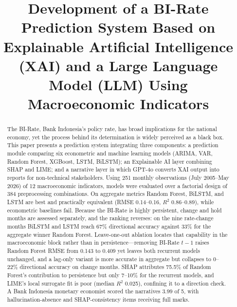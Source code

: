 \documentclass[conference]{IEEEtran}
\begin{document}
\title{Development of a BI-Rate Prediction System Based on Explainable Artificial Intelligence (XAI) and a Large Language Model (LLM) Using Macroeconomic Indicators}

\author{
\and
{}
}

\maketitle

\begin{abstract}
The BI-Rate, Bank Indonesia's policy rate, has broad implications for the national economy, yet the process behind its determination is widely perceived as a black box. This paper presents a prediction system integrating three components: a prediction module comparing six econometric and machine learning models (ARIMA, VAR, Random Forest, XGBoost, LSTM, BiLSTM); an Explainable AI layer combining SHAP and LIME; and a narrative layer in which GPT-4o converts XAI output into reports for non-technical stakeholders. Using 251 monthly observations (July 2005--May 2026) of 12 macroeconomic indicators, models were evaluated over a factorial design of 384 preprocessing combinations. On aggregate metrics Random Forest, BiLSTM, and LSTM are best and practically equivalent (RMSE 0.14--0.16, $R^2$ 0.86--0.89), while econometric baselines fail. Because the BI-Rate is highly persistent, change and hold months are assessed separately, and the ranking reverses: on the nine rate-change months BiLSTM and LSTM reach 67\% directional accuracy against 33\% for the aggregate winner Random Forest. Leave-one-out ablation locates that capability in the macroeconomic block rather than in persistence---removing BI-Rate $t-1$ raises Random Forest RMSE from 0.143 to 0.409 yet leaves both recurrent models unchanged, and a lag-only variant is more accurate in aggregate but collapses to 0--22\% directional accuracy on change months. SHAP attributes 75.5\% of Random Forest's contribution to persistence but only 7--10\% for the recurrent models, and LIME's local surrogate fit is poor (median $R^2$ 0.025), confining it to a direction check. A Bank Indonesia monetary economist scored the narratives 3.99 of 5, with hallucination-absence and SHAP-consistency items receiving full marks.
\end{abstract}
\end{document}
